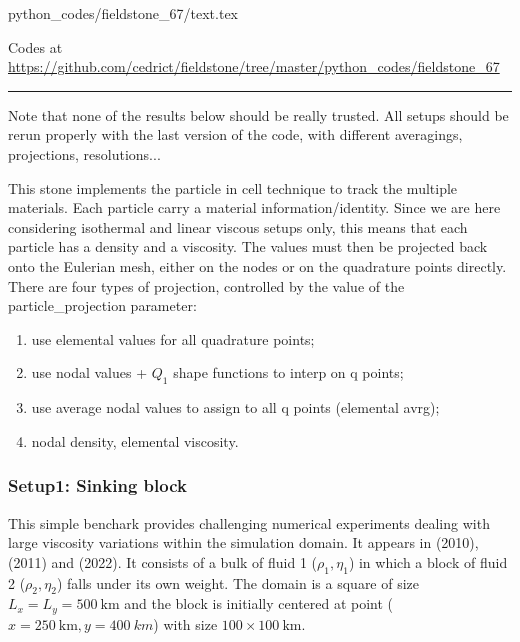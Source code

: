 \begin{flushright} {\tiny {\color{gray} python\_codes/fieldstone\_67/text.tex}} \end{flushright}



\begin{center}

Codes at \url{https://github.com/cedrict/fieldstone/tree/master/python_codes/fieldstone_67}
\end{center}

\par\noindent\rule{\textwidth}{0.4pt}


Note that none of the results below should be really trusted. All setups should be rerun 
properly with the last version of the code, with different averagings, projections, resolutions...

This stone implements the particle in cell technique to track the multiple materials.
Each particle carry a material information/identity. Since we are here considering 
isothermal and linear viscous setups only, this means that each particle has a density
and a viscosity. The values must then be projected back onto the Eulerian mesh, either 
on the nodes or on the quadrature points directly.
There are four types of projection, controlled by the value of the 
{\python particle\_projection} parameter:
\begin{enumerate}
\item  use elemental values for all quadrature points;
\item  use nodal values + $Q_1$ shape functions to interp on q points;
\item  use average nodal values to assign to all q points (elemental avrg);
\item  nodal density, elemental viscosity.
\end{enumerate}

\subsubsection*{Setup1: Sinking block} 

This simple benchark provides challenging numerical experiments dealing with large viscosity variations 
within the simulation domain. It appears in \textcite{gery10} (2010), \textcite{thie11} (2011) and
\textcite{thba22} (2022). It consists of a bulk of fluid 1 ($\rho_1,\eta_1$)
in which a block of fluid 2 ($\rho_2,\eta_2$) falls under its own weight.
The domain is a square of size $L_x=L_y=500~\si{\km}$ and the block is initially centered at 
point ($x=250~\si{\km},y=400~\si{km}$) with size $100\times100~\si{\km}$. 

